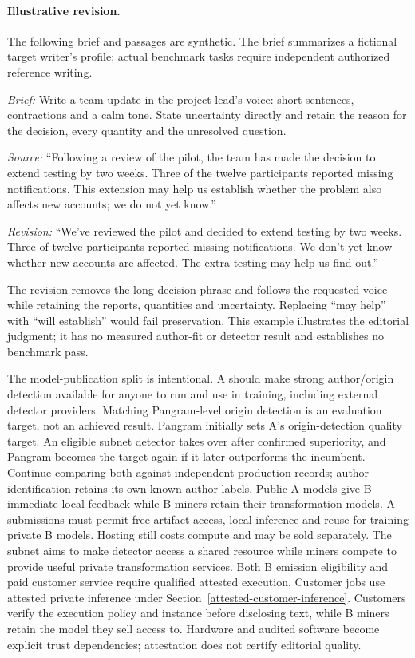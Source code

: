 \paragraph{Illustrative revision.}
The following brief and passages are synthetic. The brief summarizes a
fictional target writer's profile; actual benchmark tasks require
independent authorized reference writing.

\emph{Brief:} Write a team update in the project lead's voice: short
sentences, contractions and a calm tone. State uncertainty directly and
retain the reason for the decision, every quantity and the unresolved question.

\emph{Source:} ``Following a review of the pilot, the team has made the
decision to extend testing by two weeks. Three of the twelve participants
reported missing notifications. This extension may help us establish
whether the problem also affects new accounts; we do not yet know.''

\emph{Revision:} ``We've reviewed the pilot and decided to extend testing
by two weeks. Three of twelve participants reported missing notifications.
We don't yet know whether new accounts are affected. The extra testing
may help us find out.''

The revision removes the long decision phrase and follows the requested
voice while retaining the reports, quantities and uncertainty. Replacing
``may help'' with ``will establish'' would fail preservation. This example
illustrates the editorial judgment; it has no measured author-fit or
detector result and establishes no benchmark pass.

The model-publication split is intentional. A should make strong
author/origin detection available for anyone to run and use in training,
including external detector providers. Matching Pangram-level origin
detection is an evaluation target, not an achieved result. Pangram
initially sets A's origin-detection quality target. An eligible subnet detector
takes over after confirmed superiority, and Pangram becomes the target
again if it later outperforms the incumbent. Continue comparing both
against independent production records; author identification retains
its own known-author labels. Public A
models give B immediate local feedback while B miners retain their
transformation models. A submissions must permit free artifact access,
local inference and reuse for training private B models. Hosting still
costs compute and may be sold separately. The subnet aims to make
detector access a shared resource while miners compete to provide
useful private transformation services. Both B emission eligibility and
paid customer service require qualified attested execution. Customer jobs use
attested private inference under Section~\ref{attested-customer-inference}.
Customers verify the
execution policy and instance before disclosing text, while B miners
retain the model they sell access to. Hardware and audited software become
explicit trust dependencies; attestation does not certify editorial quality.

